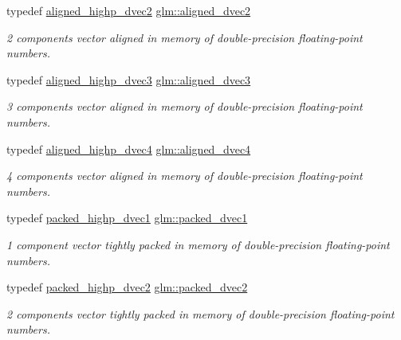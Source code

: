 \begin{DoxyCompactItemize}
typedef \hyperlink{group__gtc__type__aligned_gadc0edec95aa740d8ec351ef1e2dd39de}{aligned\+\_\+highp\+\_\+dvec2} \hyperlink{group__gtc__type__aligned_ga1e6972e837bc34b3424af8d63a71d7c6}{glm\+::aligned\+\_\+dvec2}
\begin{DoxyCompactList}\small\item\em 2 components vector aligned in memory of double-\/precision floating-\/point numbers. \end{DoxyCompactList}\item 
typedef \hyperlink{group__gtc__type__aligned_gafb21f8db25007665c2cb2a9b250471aa}{aligned\+\_\+highp\+\_\+dvec3} \hyperlink{group__gtc__type__aligned_ga82da11893fbac3bda647c9de9da62693}{glm\+::aligned\+\_\+dvec3}
\begin{DoxyCompactList}\small\item\em 3 components vector aligned in memory of double-\/precision floating-\/point numbers. \end{DoxyCompactList}\item 
typedef \hyperlink{group__gtc__type__aligned_ga4b7b03b9178c6f0574c26181a054beec}{aligned\+\_\+highp\+\_\+dvec4} \hyperlink{group__gtc__type__aligned_ga502d8d084a488118c9a5466d73ba1a46}{glm\+::aligned\+\_\+dvec4}
\begin{DoxyCompactList}\small\item\em 4 components vector aligned in memory of double-\/precision floating-\/point numbers. \end{DoxyCompactList}\item 
typedef \hyperlink{group__gtc__type__aligned_ga28333ae58dc1ce6fdf75a8dba0065603}{packed\+\_\+highp\+\_\+dvec1} \hyperlink{group__gtc__type__aligned_ga1b85bcaa9f7caaec77f3a31d35669a98}{glm\+::packed\+\_\+dvec1}
\begin{DoxyCompactList}\small\item\em 1 component vector tightly packed in memory of double-\/precision floating-\/point numbers. \end{DoxyCompactList}\item 
typedef \hyperlink{group__gtc__type__aligned_ga8c26414d99b8996aa7dc73e1dc8a06bd}{packed\+\_\+highp\+\_\+dvec2} \hyperlink{group__gtc__type__aligned_ga88996e3df7350600759c8006ffcb7782}{glm\+::packed\+\_\+dvec2}
\begin{DoxyCompactList}\small\item\em 2 components vector tightly packed in memory of double-\/precision floating-\/point numbers. \end{DoxyCompactList}\item 

\end{DoxyCompactItemize}
